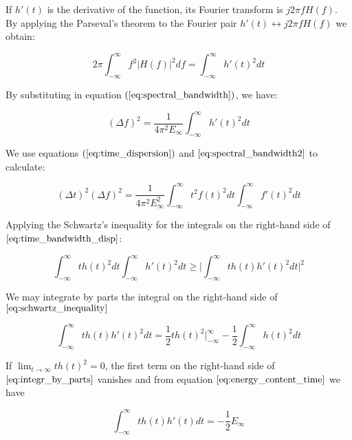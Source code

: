 If $h'(t)$ is the derivative of the function, its Fourier transform is $j2\pi f H(f)$. By applying the Parseval's theorem to the Fourier pair $h'(t)\longleftrightarrow j2\pi f H(f)$ we obtain:

\begin{equation}\label{eq:applyed_parseval_theorem}
    2 \pi \int_{-\infty}^{\infty} f^2 |H(f)|^2 df =  \int_{-\infty}^{\infty} h'(t)^2 dt
\end{equation}

By substituting in equation $(\eqref{eq:spectral_bandwidth})$, we have:

\begin{equation}\label{eq:spectral_bandwidth2}
    (\Delta f)^2 = \frac{1}{4 \pi^{2} E_{\infty}} \int_{-\infty}^{\infty} h'(t)^2 dt
\end{equation}

We use equations $(\eqref{eq:time_dispersion})$ and $\eqref{eq:spectral_bandwidth2}$ to calculate:

\begin{equation}\label{eq:time_bandwidth_disp}
    (\Delta t)^2(\Delta f)^2 = \frac{1}{4 \pi^{2} E_{\infty}^{2}} \int_{-\infty}^{\infty} t^2f(t)^2 dt \int_{-\infty}^{\infty}f'(t)^2 dt
\end{equation}

Applying the Schwartz's inequality for the integrals on the right-hand side of $\eqref{eq:time_bandwidth_disp}$:

\begin{equation}\label{eq:schwartz_inequality}
    \int_{-\infty}^{\infty}t h(t)^2 dt \int_{-\infty}^{\infty}h'(t)^2 dt  \geq \biggr\rvert \int_{-\infty}^{\infty}t h(t)h'(t)^2 dt \biggr\rvert^{2}
\end{equation}


We may integrate by parts the integral on the right-hand side of $\eqref{eq:schwartz_inequality}$

\begin{equation}\label{eq:integr_by_parts}
    \int_{-\infty}^{\infty}t h(t) h'(t)^2 dt =  \frac{1}{2}t h(t)^2 \biggr\rvert_{-\infty}^{\infty} - \frac{1}{2} \int_{-\infty}^{\infty}h(t)^2 dt
\end{equation}

If $\lim_{t\rightarrow \infty} t h(t)^2=0$, the first term on the right-hand side of $\eqref{eq:integr_by_parts}$ vanishes and from equation $\eqref{eq:energy_content_time}$ we have

\begin{equation}\label{eq:energy_content_developped}
    \int_{-\infty}^{\infty} t h(t)h'(t) dt = -\frac{1}{2} E_{\infty}
\end{equation}

